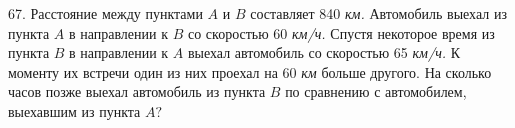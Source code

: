 67. Расстояние между пунктами $A$ и $B$ составляет 840 {\it км.} Автомобиль выехал из пункта $A$ в направлении к $B$ со скоростью 60 {\it км/ч.} Спустя некоторое время из пункта $B$ в направлении к $A$ выехал автомобиль со скоростью 65 {\it км/ч.} К моменту их встречи один из них проехал на 60 {\it км} больше другого. На сколько часов позже выехал автомобиль из пункта $B$ по сравнению с автомобилем, выехавшим из пункта $A?$\\
